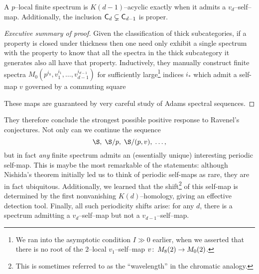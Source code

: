 \begin{theorem}\label{CdEqualsDd}
A $p$--local finite spectrum is $K(d-1)$--acyclic exactly when it admits a $v_d$--self--map.  Additionally, the inclusion $\mathsf{C}_d \subsetneq \mathsf{C}_{d-1}$ is proper.
\end{theorem}
\begin{proof}[Executive summary of proof]
Given the classification of thick subcategories, if a property is closed under thickness then one need only exhibit a single spectrum with the property to know that all the spectra in the thick subcategory it generates also all have that property.  Inductively, they manually construct finite spectra $M_0(p^{i_0}, v_1^{i_1}, \ldots, v_{d-1}^{i_{d-1}})$ for sufficiently large\footnote{We ran into the asymptotic condition $I \gg 0$ earlier, when we asserted that there is no root of the $2$--local $v_1$--self--map $v\colon\thinspace M_8(2) \to M_0(2)$.} indices $i_*$ which admit a self-map $v$ governed by a commuting square
\begin{center}
\end{center}
These maps are guaranteed by very careful study of Adams spectral sequences.
\end{proof}

They therefore conclude the strongest possible positive response to Ravenel's conjectures.  Not only can we continue the sequence \[\S, \; \S/p, \; \S/(p, v), \; \ldots,\] but in fact \emph{any} finite spectrum admits an (essentially unique) interesting periodic self-map.  This is maybe the most remarkable of the statements: although Nishida's theorem initially led us to think of periodic self-maps as rare, they are in fact ubiquitous.  Additionally, we learned that the shift\footnote{This is sometimes referred to as the ``wavelength'' in the chromatic analogy.} of this self-map is determined by the first nonvanishing $K(d)$--homology, giving an effective detection tool.  Finally, all such periodicity shifts arise: for any $d$, there is a spectrum admitting a $v_d$--self--map but not a $v_{d-1}$--self--map.

